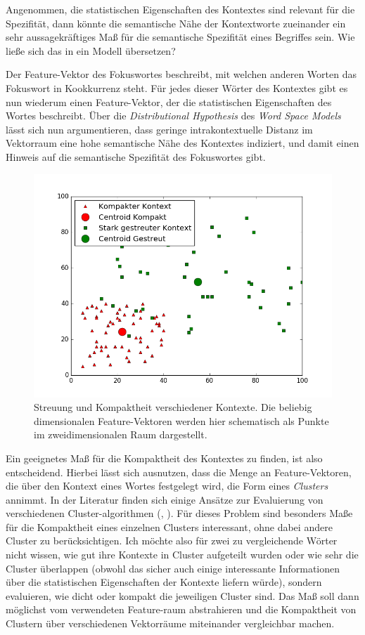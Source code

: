 \documentclass[11pt,numbers=noenddot]{scrartcl}
\begin{document}
Angenommen, die statistischen Eigenschaften des Kontextes sind relevant für die Spezifität, dann könnte die semantische Nähe der Kontextworte zueinander ein sehr aussagekräftiges Maß für die semantische Spezifität eines Begriffes sein. Wie ließe sich das in ein Modell übersetzen?

Der Feature-Vektor des Fokuswortes beschreibt, mit welchen anderen Worten das Fokuswort in Kookkurrenz steht. Für jedes dieser Wörter des Kontextes gibt es nun wiederum einen Feature-Vektor, der die statistischen Eigenschaften des Wortes beschreibt. Über die \emph{Distributional Hypothesis} des \emph{Word Space Models} lässt sich nun argumentieren, dass geringe intrakontextuelle Distanz im Vektorraum eine hohe semantische Nähe des Kontextes indiziert, und damit einen Hinweis auf die semantische Spezifität des Fokuswortes gibt.

\begin{figure}
    \includegraphics[width = \textwidth]{kontext}
    \caption{Streuung und Kompaktheit verschiedener Kontexte. Die beliebig dimensionalen Feature-Vektoren werden hier schematisch als Punkte im zweidimensionalen Raum dargestellt.}
    \label{kontext}
\end{figure}

Ein geeignetes Maß für die Kompaktheit des Kontextes zu finden, ist also entscheidend. Hierbei lässt sich ausnutzen, dass die Menge an Feature-Vektoren, die über den Kontext eines Wortes festgelegt wird, die Form eines \emph{Clusters} annimmt. In der Literatur finden sich einige Ansätze zur Evaluierung von verschiedenen Cluster-algorithmen (\citet{dunn1974}, \citet{Halkidi2001}). Für dieses Problem sind besonders Maße für die Kompaktheit eines einzelnen Clusters interessant, ohne dabei andere Cluster zu berücksichtigen. Ich möchte also für zwei zu vergleichende Wörter nicht wissen, wie gut ihre Kontexte in Cluster aufgeteilt wurden oder wie sehr die Cluster überlappen (obwohl das sicher auch einige interessante Informationen über die statistischen Eigenschaften der Kontexte liefern würde), sondern evaluieren, wie dicht oder kompakt die jeweiligen Cluster sind. Das Maß soll dann möglichst vom verwendeten Feature-raum abstrahieren und die Kompaktheit von Clustern über verschiedenen Vektorräume miteinander vergleichbar machen.
\end{document}
